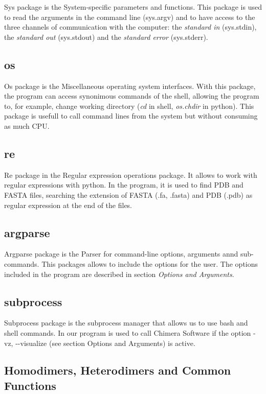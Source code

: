 \documentclass[a4paper,10pt]{report}
\begin{document}
Sys package is the System-specific parameters and functions. This package is used to read the arguments in the command line (sys.argv) and to have access to the three channels of communication with the computer: the \textit{standard in} (sys.stdin), the \textit{standard out} (sys.stdout) and the \textit{standard error} (sys.stderr).

\subsection{os}

Os package is the Miscellaneous operating system interfaces. With this package, the program can access synonimous commands of the shell, allowing the program to, for example, change working directory (\textit{cd} in shell, \textit{os.chdir} in python). 
This package is usefull to call command lines from the system but without consuming as much CPU.

\subsection{re}

Re package in the Regular expression operations package. It allows to work with regular expressions with python. In the program, it is used to find PDB and FASTA files, searching the extension of FASTA (.fa, .fasta) and PDB (.pdb) as regular expression at the end of the files.


\subsection{argparse}

Argparse package is the Parser for command-line options, arguments annd sub-commands. This packages allows to include the options for the user. The options included in the program are described in section \textit{Options and Arguments}.

\subsection{subprocess}

Subprocess package is the subprocess manager that allows us to use bash and shell commands. In our program is used to call Chimera Software if the option -vz, -{}-visualize (see section Options and Arguments) is active.

\subsection{Homodimers, Heterodimers and Common Functions}
\end{document}
